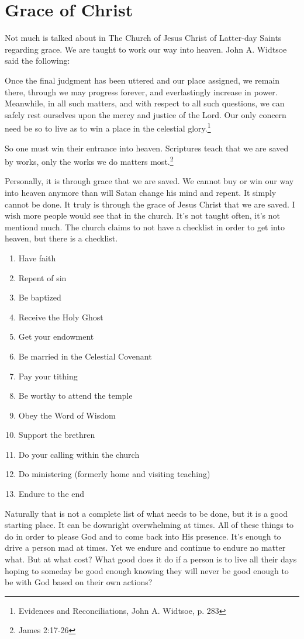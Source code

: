 \chapter{Grace of Christ}

Not much is talked about in The Church of Jesus Christ of Latter-day Saints regarding
grace. We are taught to work our way into heaven. John A. Widtsoe said the following:

\begin{displayquote}
Once the final judgment has been uttered and our place assigned, we remain there,
through we may progress forever, and everlastingly increase in power. Meanwhile, in
all such matters, and with respect to all such questions, we can safely rest
ourselves upon the mercy and justice of the Lord. Our only concern need be so to live
as to win a place in the celestial glory.\footnote{Evidences and Reconciliations, 
John A. Widtsoe, p. 283}
\end{displayquote}

So one must win their entrance into heaven. Scriptures teach that we are saved by
works, only the works we do matters most.\footnote{James 2:17-26}

Personally, it is through grace that we are saved. We cannot buy or win our way into
heaven anymore than will Satan change his mind and repent. It simply cannot be done.
It truly is through the grace of Jesus Christ that we are saved. I wish more people
would see that in the church. It's not taught often, it's not mentiond much. The
church claims to not have a checklist in order to get into heaven, but there is a
checklist.

\begin{enumerate}
\item Have faith
\item Repent of sin
\item Be baptized
\item Receive the Holy Ghost
\item Get your endowment
\item Be married in the Celestial Covenant
\item Pay your tithing
\item Be worthy to attend the temple
\item Obey the Word of Wisdom
\item Support the brethren
\item Do your calling within the church
\item Do ministering (formerly home and visiting teaching)
\item Endure to the end
\end{enumerate}

Naturally that is not a complete list of what needs to be done, but it is a good
starting place. It can be downright overwhelming at times. All of these things to do
in order to please God and to come back into His presence. It's enough to drive a
person mad at times. Yet we endure and continue to endure no matter what. But at what
cost? What good does it do if a person is to live all their days hoping to someday be
good enough knowing they will never be good enough to be with God based on their own
actions?